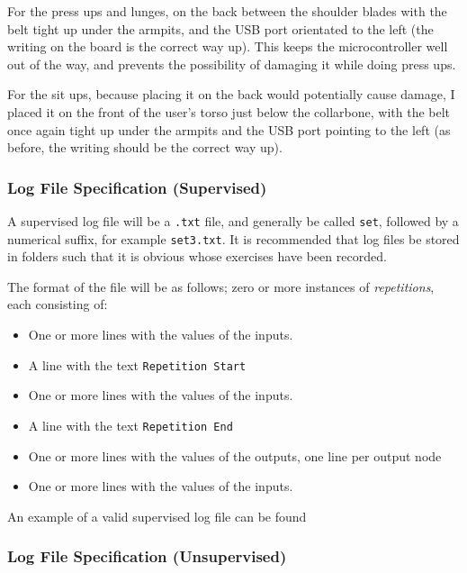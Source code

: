 \documentclass[a4paper]{article}
\begin{document}
For the press ups and lunges, on the back between the shoulder blades with the belt tight up under the armpits, and the USB port orientated to the left (the writing on the board is the correct way up). This keeps the microcontroller well out of the way, and prevents the possibility of damaging it while doing press ups.


For the sit ups, because placing it on the back would potentially cause damage, I placed it on the front of the user's torso just below the collarbone, with the belt once again tight up under the armpits and the USB port pointing to the left (as before, the writing should be the correct way up).


\subsubsection{Log File Specification (Supervised)}

A supervised log file will be a \lstinline{.txt} file, and generally be called \lstinline{set}, followed by a numerical suffix, for example \lstinline{set3.txt}. It is recommended that log files be stored in folders such that it is obvious whose exercises have been recorded.

The format of the file will be as follows; zero or more instances of \emph{repetitions}, each consisting of:

\begin{itemize}
\item One or more lines with the values of the inputs.
\item A line with the text \lstinline{Repetition Start}
\item One or more lines with the values of the inputs.
\item A line with the text \lstinline{Repetition End}
\item One or more lines with the values of the outputs, one line per output node
\item One or more lines with the values of the inputs.
\end{itemize}

An example of a valid supervised log file can be found 

\subsubsection{Log File Specification (Unsupervised)}
\end{document}
